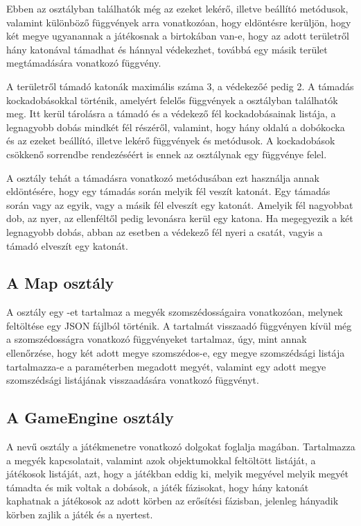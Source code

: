 Ebben az osztályban találhatók még az ezeket lekérő, illetve beállító metódusok, valamint különböző függvények arra vonatkozóan, hogy eldöntésre kerüljön, hogy két megye ugyanannak a játékosnak a birtokában van-e, hogy az adott területről hány katonával támadhat és hánnyal védekezhet, továbbá egy másik terület megtámadására vonatkozó függvény. 

A területről támadó katonák maximális száma 3, a védekezőé pedig 2.
A támadás kockadobásokkal történik, amelyért felelős függvények a  osztályban találhatók meg.
Itt kerül tárolásra a támadó és a védekező fél kockadobásainak listája, a legnagyobb dobás mindkét fél részéről, valamint, hogy hány oldalú a dobókocka és az ezeket beállító, illetve lekérő függvények és metódusok.
A kockadobások csökkenő sorrendbe rendezéséért is ennek az osztálynak egy függvénye felel. 

A  osztály tehát a támadásra vonatkozó metódusában ezt használja annak eldöntésére, hogy egy támadás során melyik fél veszít katonát.
Egy támadás során vagy az egyik, vagy a másik fél elveszít egy katonát.
Amelyik fél nagyobbat dob, az nyer, az ellenféltől pedig levonásra kerül egy katona.
Ha megegyezik a két legnagyobb dobás, abban az esetben a védekező fél nyeri a csatát, vagyis a támadó elveszít egy katonát.

\subsection*{A Map osztály}

A  osztály egy -et tartalmaz a megyék szomszédosságaira vonatkozóan, melynek feltöltése egy JSON fájlból történik.
A  tartalmát visszaadó függvényen kívül még a szomszédosságra vonatkozó függvényeket tartalmaz, úgy, mint annak ellenőrzése, hogy két adott megye szomszédos-e, egy megye szomszédsági listája tartalmazza-e a paraméterben megadott megyét, valamint egy adott megye szomszédsági listájának visszaadására vonatkozó függvényt. 

\subsection{A GameEngine osztály}

A  nevű osztály a játékmenetre vonatkozó dolgokat foglalja magában.
Tartalmazza a megyék kapcsolatait, valamint azok  objektumokkal feltöltött listáját, a játékosok listáját, azt, hogy a játékban eddig ki, melyik megyével melyik megyét támadta és mik voltak a dobások, a játék fázisokat, hogy hány katonát kaphatnak a játékosok az adott körben az erősítési fázisban, jelenleg hányadik körben zajlik a játék és a nyertest. 

